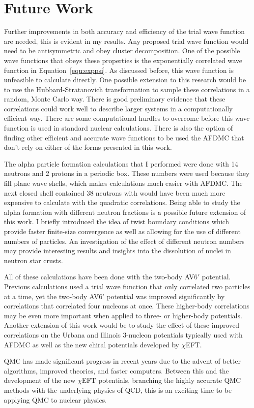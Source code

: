 \section{Future Work}
Further improvements in both accuracy and efficiency of the trial wave function are needed, this is evident in my results. Any proposed trial wave function would need to be antisymmetric and obey cluster decomposition. One of the possible wave functions that obeys these properties is the exponentially correlated wave function in Equation~\ref{equ:exppsi}. As discussed before, this wave function is unfeasible to calculate directly. One possible extension to this research would be to use the Hubbard-Stratanovich transformation to sample these correlations in a random, Monte Carlo way. There is good preliminary evidence that these correlations could work well to describe larger systems in a computationally efficient way. There are some computational hurdles to overcome before this wave function is used in standard nuclear calculations. There is also the option of finding other efficient and accurate wave functions to be used the AFDMC that don't rely on either of the forms presented in this work.

The alpha particle formation calculations that I performed were done with 14 neutrons and 2 protons in a periodic box. These numbers were used because they fill plane wave shells, which makes calculations much easier with AFDMC. The next closed shell contained 38 neutrons with would have been much more expensive to calculate with the quadratic correlations. Being able to study the alpha formation with different neutron fractions is a possible future extension of this work. I briefly introduced the idea of twist boundary conditions which provide faster finite-size convergence as well as allowing for the use of different numbers of particles. An investigation of the effect of different neutron numbers may provide interesting results and insights into the dissolution of nuclei in neutron star crusts.

All of these calculations have been done with the two-body AV6$'$ potential. Previous calculations used a trial wave function that only correlated two particles at a time, yet the two-body AV6$'$ potential was improved significantly by correlations that correlated four nucleons at once. These higher-body correlations may be even more important when applied to three- or higher-body potentials. Another extension of this work would be to study the effect of these improved correlations on the Urbana and Illinois 3-nucleon potentials typically used with AFDMC as well as the new chiral potentials developed by $\chi$EFT.

QMC has made significant progress in recent years due to the advent of better algorithms, improved theories, and faster computers. Between this and the development of the new $\chi$EFT potentials, branching the highly accurate QMC methods with the underlying physics of QCD, this is an exciting time to be applying QMC to nuclear physics.
